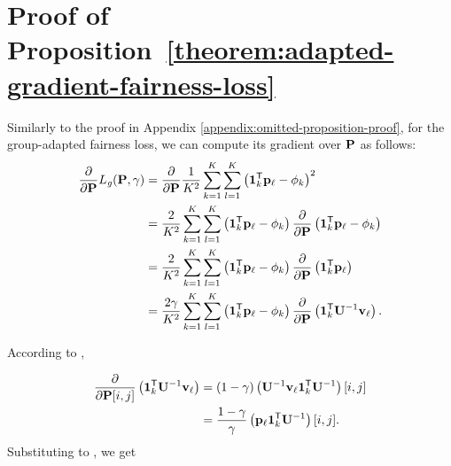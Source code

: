 
\section{Proof of Proposition~\ref{theorem:adapted-gradient-fairness-loss}}
\label{appendix:omitted-proposition-adapted-gradients}

\gaphipagerankgradient*

Similarly to the proof in Appendix \ref{appendix:omitted-proposition-proof}, for the group-adapted fairness loss, we can compute its gradient over $\mathbf{{P}}$ as follows:
\begin{equation}
\begin{aligned}
\label{eq:gradient_fairness_loss_group_adapted}
    \frac{\partial}{\partial \mathbf{{P}}} L_{\mathit{g}}(\mathbf{{P}}, \gamma) 
        & = \frac{\partial}{\partial \mathbf{{P}}} \frac{1}{K^2}
    \sum_{k=1}^{K}\sum_{l=1}^{K} \left(\mathbf{{1}}_{k}^{\mathsf{T}} \mathbf{{p}}_{\ell} - \phi_k\right)^2 \\
        & = \frac{2}{K^2} \sum_{k=1}^{K} \sum_{l=1}^{K}\left(\mathbf{{1}}_{k}^{\mathsf{T}} \mathbf{{p}}_{\ell} - \phi_k\right) 
                \frac{\partial}{\partial \mathbf{{P}}} \left(\mathbf{{1}}_{k}^{\mathsf{T}} \mathbf{{p}}_{\ell} - \phi_k\right) \\
        & = \frac{2}{K^2} \sum_{k=1}^{K} \sum_{l=1}^{K}\left(\mathbf{{1}}_{k}^{\mathsf{T}} \mathbf{{p}}_{\ell} - \phi_k\right) 
                \frac{\partial}{\partial \mathbf{{P}}} \left(\mathbf{{1}}_{k}^{\mathsf{T}} \mathbf{{p}}_{\ell} \right)  \\ 
        & = \frac{2 \gamma}{K^2} \sum_{k=1}^{K} \sum_{l=1}^{K}\left(\mathbf{{1}}_{k}^{\mathsf{T}} \mathbf{{p}}_{\ell} - \phi_k\right) 
                \frac{\partial}{\partial \mathbf{{P}}} \left(\mathbf{{1}}_{k}^{\mathsf{T}} \mathbf{{U}}^{-1} \mathbf{{v}}_{\ell} \right). 
\end{aligned}
\end{equation}

According to ,

\begin{equation}
\label{eq:gradient_onek_Uinv_v_l}
\begin{aligned}
\frac{\partial}{\partial \mathbf{{P}}[i, j]} \left(\mathbf{{1}}_{k}^{\mathsf{T}} \mathbf{{U}}^{-1} \mathbf{{v}}_{\ell} \right) 
    & = (1 - \gamma) \left( \mathbf{{U}}^{-1} \mathbf{{v}}_{\ell} \mathbf{{1}}_{k}^{\mathsf{T}} \mathbf{{U}}^{-1} \right)[i, j] \\
    & = \frac{1 - \gamma}{\gamma} \left( \mathbf{{p}}_{\ell}\mathbf{{1}}_{k}^{\mathsf{T}} \mathbf{{U}}^{-1} \right)[i, j].
\end{aligned}
\end{equation}
Substituting  to , we get

